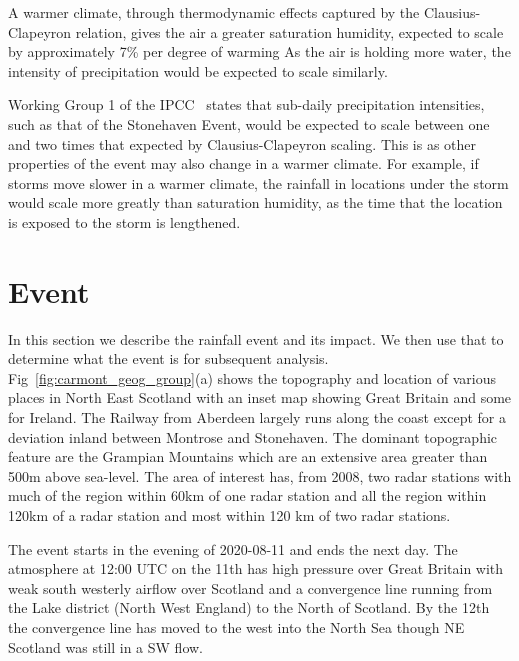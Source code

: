 \documentclass[11pt,a4paper]{article}
\begin{document}
A warmer climate,
through thermodynamic effects captured by the Clausius-Clapeyron relation,
gives the air a greater saturation humidity,
expected to scale by approximately 7\% per degree of warming\parencite{fowler2021rainfall_extremes}
As the air is holding more water,
the intensity of precipitation would be expected to scale similarly.

Working Group 1 of the IPCC~\cite{IPCC_2021} states that sub-daily precipitation intensities,
such as that of the Stonehaven Event,
would be expected to scale between one and two times that expected by Clausius-Clapeyron scaling.
This is as other properties of the event may also change in a warmer climate.
For example,
if storms move slower in a warmer climate,
the rainfall in locations under the storm would scale more greatly than saturation humidity,
as the time that the location is exposed to the storm is lengthened.

\section{Event}

In this section we describe the rainfall event and its impact. We then use that to determine what the event is for subsequent analysis. Fig~\ref{fig:carmont_geog_group}(a) shows the topography and location of various places in North East Scotland with an inset map showing Great Britain and some for Ireland. The Railway from Aberdeen largely runs along the coast except for a deviation inland between Montrose and Stonehaven.  The dominant topographic feature are the Grampian Mountains which are an extensive area greater than 500m above sea-level. The area of interest has, from 2008, two radar stations with much of the region within 60km of one radar station and  all the region within 120km of a radar station and most within 120 km of two radar stations. 

  The event starts in the evening of 2020-08-11 and ends the next day. The atmosphere  at 12:00 UTC on the 11th has high pressure over Great Britain with weak south westerly airflow over Scotland and a convergence line running from the Lake district (North West England) to the North of Scotland\parencite{pritchard2020weather}. By the 12th the convergence line has moved to the west into the North Sea though NE Scotland was still in a SW flow. 
\end{document}

